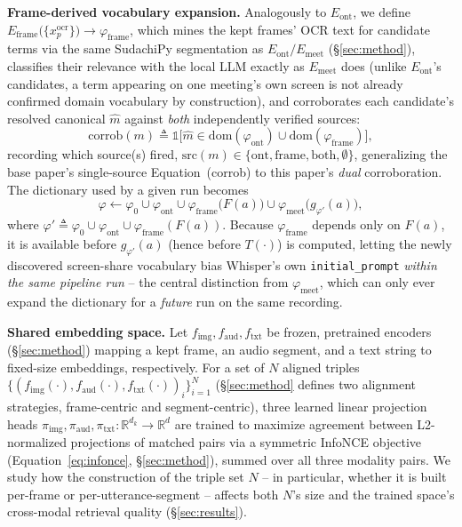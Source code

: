 ﻿\documentclass[twocolumn]{article}
\begin{document}
\textbf{Frame-derived vocabulary expansion.} Analogously to $E_{\text{ont}}$, we define
$E_{\text{frame}}\big(\{x^{\text{ocr}}_p\}\big) \rightarrow \varphi_{\text{frame}}$, which mines the
kept frames' OCR text for candidate terms via the same SudachiPy segmentation as
$E_{\text{ont}}/E_{\text{meet}}$ (\S\ref{sec:method}), classifies their relevance with the local LLM
exactly as $E_{\text{meet}}$ does (unlike $E_{\text{ont}}$'s candidates, a term appearing on one
meeting's own screen is not already confirmed domain vocabulary by construction), and corroborates
each candidate's resolved canonical $\hat{m}$ against \emph{both} independently verified sources:
\begin{equation}
  \mathrm{corrob}(m) \triangleq \mathbb{1}\big[\hat{m} \in \mathrm{dom}(\varphi_{\text{ont}}) \cup
    \mathrm{dom}(\varphi_{\text{frame}})\big],
  \label{eq:dual-corrob}
\end{equation}
recording which source(s) fired, $\mathrm{src}(m) \in \{\text{ont}, \text{frame}, \text{both},
\emptyset\}$, generalizing the base paper's single-source Equation~(corrob) to this paper's
\emph{dual} corroboration. The dictionary used by a given run becomes
\begin{equation}
  \varphi \leftarrow \varphi_0 \cup \varphi_{\text{ont}} \cup \varphi_{\text{frame}}\big(F(a)\big)
    \cup \varphi_{\text{meet}}\big(g_{\varphi'}(a)\big),
  \label{eq:expansion-frame}
\end{equation}
where $\varphi' \triangleq \varphi_0 \cup \varphi_{\text{ont}} \cup \varphi_{\text{frame}}(F(a))$.
Because $\varphi_{\text{frame}}$ depends only on $F(a)$, it is available before $g_{\varphi'}(a)$
(hence before $T(\cdot)$) is computed, letting the newly discovered screen-share vocabulary bias
Whisper's own \texttt{initial\_prompt} \emph{within the same pipeline run} -- the central
distinction from $\varphi_{\text{meet}}$, which can only ever expand the dictionary for a
\emph{future} run on the same recording.

\textbf{Shared embedding space.} Let $f_{\text{img}}, f_{\text{aud}}, f_{\text{txt}}$ be frozen,
pretrained encoders (\S\ref{sec:method}) mapping a kept frame, an audio segment, and a text string to
fixed-size embeddings, respectively. For a set of $N$ aligned triples
$\{(f_{\text{img}}(\cdot), f_{\text{aud}}(\cdot), f_{\text{txt}}(\cdot))_i\}_{i=1}^N$
(\S\ref{sec:method} defines two alignment strategies, frame-centric and segment-centric), three
learned linear projection heads $\pi_{\text{img}}, \pi_{\text{aud}}, \pi_{\text{txt}}: \mathbb{R}^{d_k}
\rightarrow \mathbb{R}^{d}$ are trained to maximize agreement between L2-normalized projections of
matched pairs via a symmetric InfoNCE objective (Equation~\ref{eq:infonce}, \S\ref{sec:method}),
summed over all three modality pairs. We study how the construction of the triple set $N$ -- in
particular, whether it is built per-frame or per-utterance-segment -- affects both $N$'s size and
the trained space's cross-modal retrieval quality (\S\ref{sec:results}).
\end{document}
